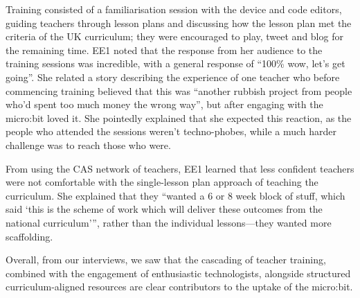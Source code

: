 Training consisted of a familiarisation session with the device and code editors, guiding teachers through lesson plans and discussing how the lesson plan met the criteria of the UK curriculum; they were encouraged to play, tweet and blog for the remaining time. EE1 noted that the response from her audience to the training sessions was incredible, with a general response of ``100\% wow, let's get going''. She related a story describing the experience of one teacher who before commencing training believed that this was ``another rubbish project from people who'd spent too much money the wrong way'', but after engaging with the micro:bit loved it. She pointedly explained that she expected this reaction, as the people who attended the sessions weren't techno-phobes, while a much harder challenge was to reach those who were.

From using the CAS network of teachers, EE1 learned that less confident teachers were not comfortable with the single-lesson plan approach of teaching the curriculum. She explained that they ``wanted a 6 or 8 week block of stuff, which said `this is the scheme of work which will deliver these outcomes from the national curriculum''', rather than the individual lessons---they wanted more scaffolding.

Overall, from our interviews, we saw that the cascading of teacher training, combined with the engagement of enthusiastic technologists, alongside structured curriculum-aligned resources are clear contributors to the uptake of the micro:bit.


